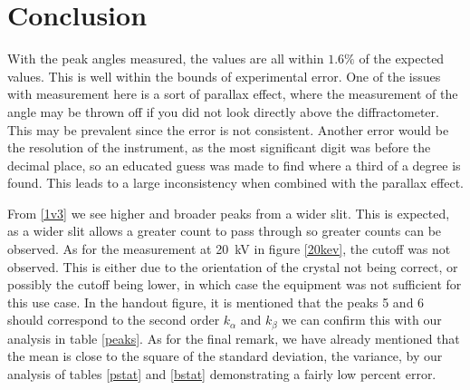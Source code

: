 \documentclass[letterpaper,12pt]{article}
\begin{document}
\section{Conclusion}
With the peak angles measured, the values are all within $1.6\%$ of the expected values. This is well within the bounds of experimental error. One of the issues with measurement here is a sort of parallax effect, where the measurement of the angle may be thrown off if you did not look directly above the diffractometer. This may be prevalent since the error is not consistent. Another error would be the resolution of the instrument, as the most significant digit was before the decimal place, so an educated guess was made to find where a third of a degree is found. This leads to a large inconsistency when combined with the parallax effect.

From \ref{1v3} we see higher and broader peaks from a wider slit. This is expected, as a wider slit allows a greater count to pass through so greater counts can be observed. As for the measurement at \SI{20}{\kV} in figure \ref{20kev}, the cutoff was not observed. This is either due to the orientation of the crystal not being correct, or possibly the cutoff being lower, in which case the equipment was not sufficient for this use case. In the handout figure, it is mentioned that the peaks 5 and 6 should correspond to the second order $k_\alpha$ and $k_\beta$ we can confirm this with our analysis in table \ref{peaks}. As for the final remark, we have already mentioned that the mean is close to the square of the standard deviation, the variance, by our analysis of tables \ref{pstat} and \ref{bstat} demonstrating a fairly low percent error. 









\end{document}
